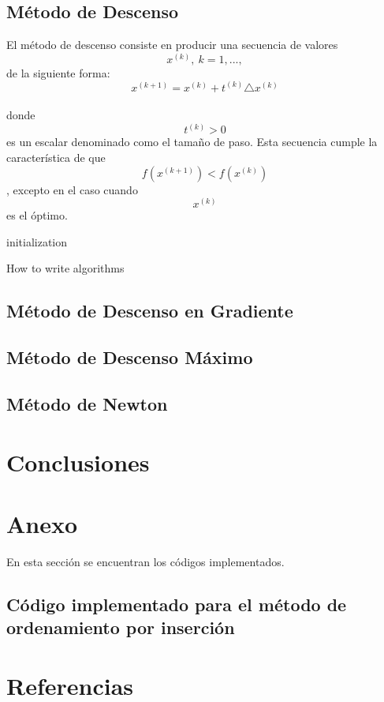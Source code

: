 \documentclass[]{article}
\begin{document}
\subsection{Método de Descenso}

El método de descenso consiste en producir una secuencia de valores
\[x^{(k)}, \ k=1,...,\] de la siguiente forma:\\
\[x^{(k+1)}= x^{(k)}+t^{(k)}\triangle x^{(k)}\]\\
donde \[t^{(k)} > 0\] es un escalar denominado como el tamaño de paso.
Esta secuencia cumple la característica de que
\[f(x^{(k+1)})<f(x^{(k)})\], excepto en el caso cuando \[x^{(k)}\] es el
óptimo.

\begin{algorithm}[H]
 initialization\;
 \caption{How to write algorithms}
\end{algorithm}

\subsection{Método de Descenso en Gradiente}

\subsection{Método de Descenso Máximo}

\subsection{Método de Newton}

\newpage

\section{Conclusiones}

\newpage

\section{Anexo}

En esta sección se encuentran los códigos implementados.

\subsection{Código implementado para el método de ordenamiento por inserción}

\newpage

\section{Referencias}
\end{document}
